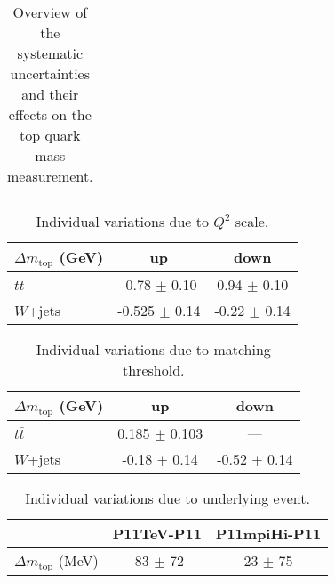 \begin{table}[!htp]
\begin{center}
\begin{tabular}{l|c}
\end{tabular}
\caption{\label{tab:top_mass_systematics}Overview of the systematic uncertainties
and their effects on the top quark mass measurement.}
\end{center}
\end{table}


\begin{table}[!htp]
\begin{center}
\begin{tabular}{l|c|c}
\hline\hline
$\Delta m_{\textrm{top}}$ (GeV)        & up  & down\\
\hline
$t \bar t$      & -0.78  $\pm$ 0.10 & 0.94 $\pm$ 0.10 \\
$W$+jets        & -0.525 $\pm$ 0.14 & -0.22 $\pm$ 0.14 \\
\hline\hline
\end{tabular}
\caption{\label{tab:systematicsScale}Individual variations due to $Q^2$ scale.}
\end{center}
\end{table}


\begin{table}[!htp]
\begin{center}
\begin{tabular}{l|c|c}
\hline\hline
$\Delta m_{\textrm{top}}$ (GeV)        & up  & down\\
\hline
$t \bar t$   &0.185 $\pm$ 0.103 & --- \\
$W$+jets     & -0.18 $\pm$ 0.14 & -0.52 $\pm$ 0.14 \\
\hline\hline
\end{tabular}
\caption{\label{tab:systematicsMatching}Individual variations due to matching threshold.}
\end{center}
\end{table}


\begin{table}[!htp]
\begin{center}
\begin{tabular}{l|c|c}
\hline\hline
        & P11TeV-P11  & P11mpiHi-P11\\
\hline
$\Delta m_{\textrm{top}}$ (MeV)      & -83 $\pm$ 72  & 23 $\pm$ 75 \\
\hline\hline
\end{tabular}
\caption{\label{tab:systematicsUE}Individual variations due to underlying event.}
\end{center}
\end{table}


